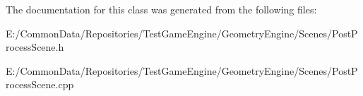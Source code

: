 The documentation for this class was generated from the following files\+:\begin{DoxyCompactItemize}
\item 
E\+:/\+Common\+Data/\+Repositories/\+Test\+Game\+Engine/\+Geometry\+Engine/\+Scenes/Post\+Process\+Scene.\+h\item 
E\+:/\+Common\+Data/\+Repositories/\+Test\+Game\+Engine/\+Geometry\+Engine/\+Scenes/Post\+Process\+Scene.\+cpp\end{DoxyCompactItemize}
